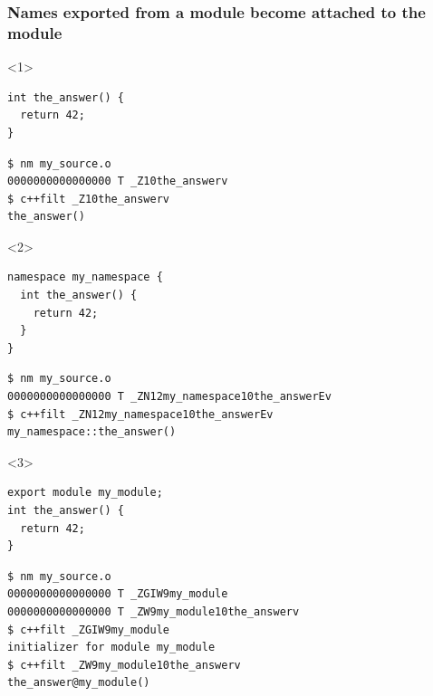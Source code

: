 \documentclass[aspectratio=169]{beamer}
\begin{document}
\begin{frame}[fragile]
  \frametitle{Names exported from a module become attached to the module}

  \begin{onlyenv}<1>
  \begin{lstlisting}[style=cpp20]
int the_answer() {
  return 42;
}
  \end{lstlisting}

  \begin{lstlisting}
$ nm my_source.o
0000000000000000 T _Z10the_answerv
$ c++filt _Z10the_answerv
the_answer()
  \end{lstlisting}
  \end{onlyenv}

  \begin{onlyenv}<2>
  \begin{lstlisting}[style=cpp20]
namespace my_namespace {
  int the_answer() {
    return 42;
  }
}
  \end{lstlisting}

  \begin{lstlisting}
$ nm my_source.o
0000000000000000 T _ZN12my_namespace10the_answerEv
$ c++filt _ZN12my_namespace10the_answerEv
my_namespace::the_answer()
  \end{lstlisting}
  \end{onlyenv}

  \begin{onlyenv}<3>
  \begin{lstlisting}[style=cpp20]
export module my_module;
int the_answer() {
  return 42;
}
  \end{lstlisting}

  \begin{lstlisting}[style=none]
$ nm my_source.o
0000000000000000 T _ZGIW9my_module
0000000000000000 T _ZW9my_module10the_answerv
$ c++filt _ZGIW9my_module
initializer for module my_module
$ c++filt _ZW9my_module10the_answerv
the_answer@my_module()
  \end{lstlisting}
  \end{onlyenv}

\end{frame}
\end{document}
